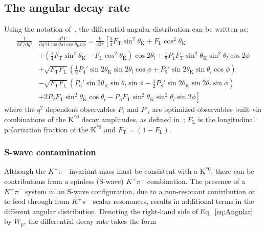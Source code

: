 
\subsection{The angular decay rate}
\label{sec:decRate}

Using the notation of~\cite{Ball2009}, the differential angular distribution can be written as:
\begin{equation} \label{eq:Angular}
    \begin{split}
        \frac{1}{\mathrm{d}\Gamma/\mathrm{d}q^2}&\frac{\mathrm{d}^4\Gamma}{\mathrm{d}q^2 \mathrm{d}\cos\theta_l \mathrm{d}\cos\theta_\mathrm{K} \mathrm{d}\phi} =\frac{9}{32\pi}\left[\frac{3}{4}F_\mathrm{T}\sin^2\theta_\mathrm{K} + F_\mathrm{L}\cos^2\theta_\mathrm{K} \right.\\
            &\left.+\left(\frac{1}{4}F_\mathrm{T}\sin^2\theta_\mathrm{K}-F_\mathrm{L}\cos^2\theta_\mathrm{K}\right)\cos2\theta_l+\frac{1}{2}P_1F_\mathrm{T}\sin^2\theta_\mathrm{K}\sin^2\theta_l\cos 2\phi \right.\\
            &+\sqrt{F_\mathrm{T}F_\mathrm{L}}\left(\frac{1}{2}P_4'\sin2\theta_\mathrm{K}\sin2\theta_l\cos\phi+P_5'\sin2\theta_\mathrm{K}\sin\theta_l\cos\phi \right)\\
            &-\sqrt{F_\mathrm{T}F_\mathrm{L}}\left(P_6'\sin2\theta_\mathrm{K}\sin\theta_l\sin\phi-\frac{1}{2}P_8'\sin2\theta_\mathrm{K}\sin2\theta_l\sin\phi \right)\\
            &\left.+2P_2F_\mathrm{T}\sin^2\theta_\mathrm{K}\cos\theta_l-P_3F_\mathrm{T}\sin^2\theta_\mathrm{K}\sin^2\theta_l\sin2\phi \right]
    \end{split}
\end{equation}
where the $q^2$ dependent observables $P_i$ and $P'_i$ are optimized observables built via 
combinations of the $\text{K}^{*0}$ decay amplitudes, as defined in~\cite{Genon:Swave};
$F_\mathrm{L}$ is the longitudinal polarization fraction of the $\text{K}^{*0}$ and
$F_\mathrm{T}=(1-F_\mathrm{L})$.
\subsubsection{S-wave contamination}
\label{sec:S-waveform}
Although the $K^+\pi^-$ invariant mass must be consistent with a
$\text{K}^{*0}$, there can be contributions from a spinless (S-wave)
$K^+\pi^-$ combination. The presence of a $K^+\pi^-$
system in an S-wave configuration, due to a non-resonant contribution or
to feed through from $K^+\pi^-$ scalar resonances, results in additional
terms in the different angular distribution. Denoting the right-hand side
 of Eq.~\ref{eq:Angular} by $W_p$, the differential decay rate takes the form

